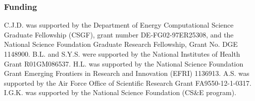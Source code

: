 \documentclass[twocolumn, 10pt]{article}
\begin{document}
\subsubsection*{Funding}
C.J.D. was supported by the Department of Energy Computational Science Graduate Fellowship (CSGF), grant number DE-FG02-97ER25308, and the National Science Foundation Graduate Research Fellowship, Grant No. DGE 1148900.
%
B.L. and S.Y.S. were supported by the National Institutes of Health Grant R01GM086537. 
%
H.L. was supported by the National Science Foundation Grant Emerging Frontiers in Research and Innovation (EFRI) 1136913.
%
A.S. was supported by the Air Force Office of Scientific Research Grant
FA9550-12-1-0317.
%
I.G.K. was supported by the National Science Foundation (CS\&E program).




\end{document}
